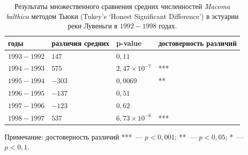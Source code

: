 	\begin{table}[p]
	\begin{tabularx}{\textwidth}{|*{4}{X|}} \hline
	годы & различия средних & p-value & достоверность различий\\
	\hline
	$1993-1992$ & $147$ &  $0,11$ & \\
	\hline
	$1994-1993$ & $575$  & $2,47 \times 10^{-7}$ & *** \\
	\hline
	$1995-1994$ & $-303$  & $0,0069$ & ** \\
	\hline
	$1996-1995$ & $-137$  & $0,51$ & \\
	\hline
	$1997-1996$ & $-123$  & $0,62$ & \\
	\hline
	$1998-1997$ & $537$  & $6,73 \times 10^{-6}$ & *** \\
	\hline
	\end{tabularx}

	{\footnotesize Примечание: достоверность различий ***~--- $p<0,001$; **~--- $p<0,05$; *~--- $p<0,1$.}
	\caption{Результаты множественного сравнения средних численностей {\it Macoma balthica} методом Тьюки (Tukey's ‘Honest Significant Difference’) в эстуарии реки Лувеньги в $1992-1998$ годах.}
	\label{tab:Tukey_estuary_92_98_n2}
	\end{table}

